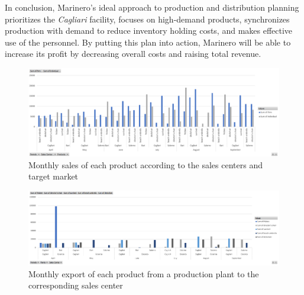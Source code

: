 \documentclass [a4paper,12pt,titlepage]{article}
\begin{document}
In conclusion, Marinero's ideal approach to production and distribution planning prioritizes the \textit{Cagliari} facility, focuses on high-demand products, synchronizes production with demand to reduce inventory holding costs, and makes effective use of the personnel. By putting this plan into action, Marinero will be able to increase its profit by decreasing overall costs and raising total revenue.

\newpage

\begin{figure}[H]
  \centering
  \includegraphics[width=1\textwidth]{graph1.png}
  \caption{Monthly sales of each product according to the sales centers and target market }
  \label{fig: graph1}
\end{figure}

\begin{figure}[H]
  \centering
  \includegraphics[width=1\textwidth]{graph2.png}
  \caption{Monthly export of each product from a production plant to the corresponding sales center}
  \label{fig: graph2}
\end{figure}
\end{document}
